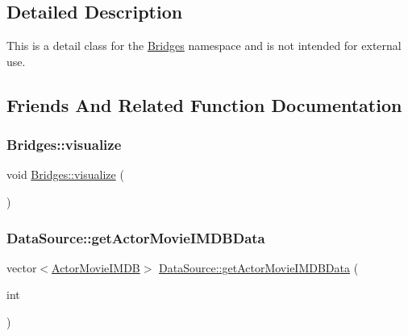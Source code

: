 \subsection{Detailed Description}
This is a detail class for the \mbox{\hyperlink{namespacebridges_1_1_bridges}{Bridges}} namespace and is not intended for external use. 

\subsection{Friends And Related Function Documentation}
\mbox{\label{classbridges_1_1_server_comm_a0a9e3be9faab475909293766dcda4779}} 
\subsubsection{\texorpdfstring{Bridges\+::visualize}{Bridges::visualize}}
{\footnotesize\ttfamily void \mbox{\hyperlink{namespacebridges_1_1_bridges_a2806e395134614cdd6327400b53d28ad}{Bridges\+::visualize}} (\begin{DoxyParamCaption}{ }\end{DoxyParamCaption})\hspace{0.3cm}{\ttfamily [friend]}}

\mbox{\label{classbridges_1_1_server_comm_aeea4f9e05ded118d657ac8ba9e66f22d}} 
\subsubsection{\texorpdfstring{Data\+Source\+::get\+Actor\+Movie\+I\+M\+D\+B\+Data}{DataSource::getActorMovieIMDBData}}
{\footnotesize\ttfamily vector$<$\mbox{\hyperlink{classbridges_1_1_actor_movie_i_m_d_b}{Actor\+Movie\+I\+M\+DB}}$>$ \mbox{\hyperlink{namespacebridges_1_1_data_source_ac43ccd8f2a325cf2f057a5ee7f0b73f1}{Data\+Source\+::get\+Actor\+Movie\+I\+M\+D\+B\+Data}} (\begin{DoxyParamCaption}\item[{int}]{ }\end{DoxyParamCaption})\hspace{0.3cm}{\ttfamily [friend]}}

